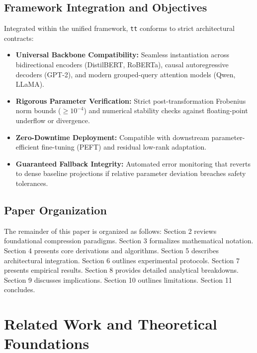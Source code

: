 \subsection{Framework Integration and Objectives}
Integrated within the unified framework, \texttt{tt} conforms to strict architectural contracts:
\begin{itemize}
\item \textbf{Universal Backbone Compatibility:} Seamless instantiation across bidirectional encoders (DistilBERT, RoBERTa), causal autoregressive decoders (GPT-2), and modern grouped-query attention models (Qwen, LLaMA).
\item \textbf{Rigorous Parameter Verification:} Strict post-transformation Frobenius norm bounds ($\ge 10^{-4}$) and numerical stability checks against floating-point underflow or divergence.
\item \textbf{Zero-Downtime Deployment:} Compatible with downstream parameter-efficient fine-tuning (PEFT) and residual low-rank adaptation.
\item \textbf{Guaranteed Fallback Integrity:} Automated error monitoring that reverts to dense baseline projections if relative parameter deviation breaches safety tolerances.
\end{itemize}

\subsection{Paper Organization}
The remainder of this paper is organized as follows: Section 2 reviews foundational compression paradigms. Section 3 formalizes mathematical notation. Section 4 presents core derivations and algorithms. Section 5 describes architectural integration. Section 6 outlines experimental protocols. Section 7 presents empirical results. Section 8 provides detailed analytical breakdowns. Section 9 discusses implications. Section 10 outlines limitations. Section 11 concludes.


\section{Related Work and Theoretical Foundations}

